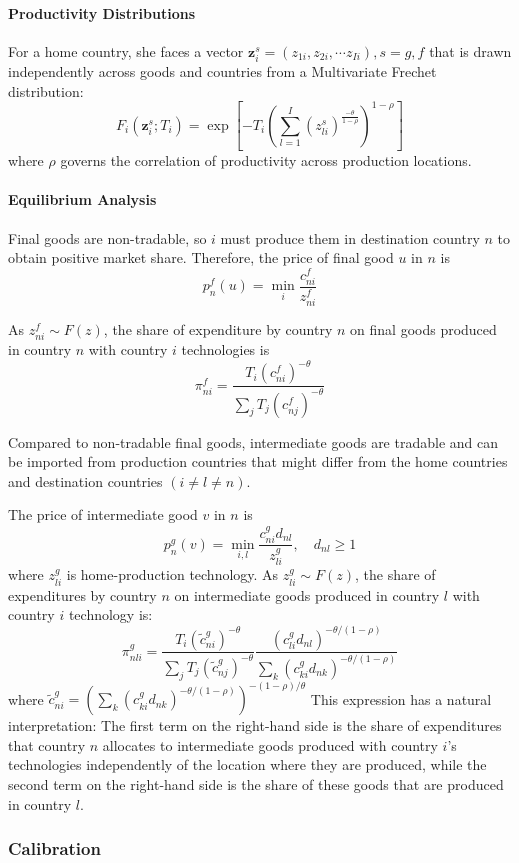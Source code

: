 \paragraph{Productivity Distributions}
For a home country, she faces
a vector $\mathbf{z}_i^s = (z_{1i}, z_{2i}, \cdots z_{Ii}), s = g, f$ that is 
drawn independently across goods and countries from a Multivariate Frechet distribution:
\begin{equation}
    F_i\left(\mathbf{z}_i^s; T_i \right) 
    =\exp \left[-T_i\left(\sum_{l=1}^I\left(z_{l i}^s\right)^{\frac{-\theta}{1-\rho}}\right)^{1-\rho}\right]
\end{equation}
where $\rho$ governs the correlation of productivity across production locations.

\paragraph{Equilibrium Analysis}
Final goods are non-tradable, so $i$ must produce them in destination country $n$ to obtain positive market share.
Therefore, the price of final good $u$ in $n$ is 
\begin{equation*}
    p_n^f(u) = \min_i \frac{c_{ni}^f}{z_{ni}^f}
\end{equation*}

As $z_{ni}^f \sim F(z)$, 
the share of expenditure by country $n$ on final goods produced in country $n$ with country $i$ technologies is 
\begin{equation}
    \pi_{ni}^f = \frac{T_i (c_{ni}^f)^{-\theta}}{\sum_j T_j (c_{nj}^f)^{-\theta}}
\end{equation}


Compared to non-tradable final goods,
intermediate goods are tradable and can be imported from production countries that might differ 
from the home countries and destination countries $(i \neq l \neq n)$.

The price of intermediate good $v$ in $n$ is 
\begin{equation*}
    p_n^g(v) = \min_{i,l} \frac{c_{ni}^g d_{nl}}{z_{li}^g}, \quad d_{nl} \geq 1
\end{equation*}
where $z_{li}^g$ is home-production technology.
As $z_{li}^g \sim F(z)$, 
the share of expenditures by country $n$ on intermediate goods produced in country $l$ with country $i$ technology is:
\begin{equation}
    \pi_{n l i}^g = \frac{T_i\left(\tilde{c}_{n i}^g\right)^{-\theta}
            }{
                \sum_j T_j\left(\tilde{c}_{n j}^g\right)^{-\theta}} 
                \frac{\left(c_{l i}^g d_{n l}\right)^{-\theta /(1-\rho)}
                }{\sum_k\left(c_{k i}^g d_{n k}\right)^{-\theta /(1-\rho)}
                }
\end{equation}
where $\tilde{c}_{n i}^g=\left(\sum_k\left(c_{k i}^g d_{n k}\right)^{-\theta /(1-\rho)}\right)^{-(1-\rho) / \theta}$
This expression has a natural interpretation: 
The first term on the right-hand side is the share of expenditures that country $n$ allocates to intermediate goods produced with
country $i$’s technologies independently of the location where they are produced,
while the second term on the right-hand side is the share of these goods that are produced in country $l$. 

\subsubsection{Calibration}
